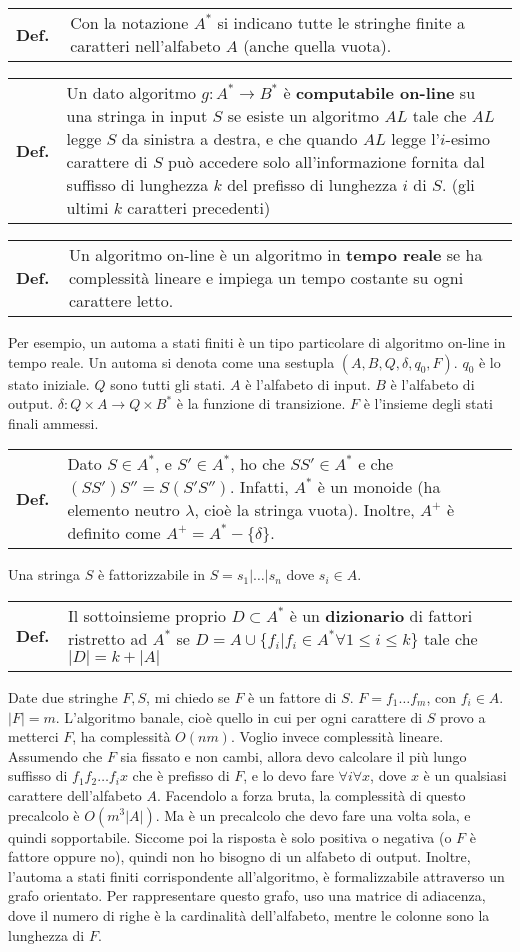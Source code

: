 \documentclass[a4paper,10pt]{article} %
\renewcommand{\b}[1]{%
    {\textbf{#1}}}
\newcommand{\mdef}[1]{%
    {\smallbreak\par\begin{tabular}{ll} \textbf{Def.$\;\;$} & \begin{minipage}[t]{0.80\columnwidth}\normalsize  {#1}\end{minipage}\tabularnewline \end{tabular}}\smallskip\par}
\begin{document}
\mdef{Con la notazione $A^*$ si indicano tutte le stringhe finite a caratteri nell'alfabeto $A$ (anche quella vuota).}

\mdef{Un dato algoritmo $g: A^* \rightarrow B^*$ è \b{computabile on-line} su una stringa in input $S$ se esiste un algoritmo $AL$ tale che $AL$ legge $S$ da sinistra a destra, e che quando $AL$ legge l'$i$-esimo carattere di $S$ può accedere solo all'informazione fornita dal suffisso di lunghezza $k$ del prefisso di lunghezza $i$ di $S$. (gli ultimi $k$ caratteri precedenti)}

\mdef{Un algoritmo on-line è un algoritmo in \b{tempo reale} se ha complessità lineare e impiega un tempo costante su ogni carattere letto.}

Per esempio, un automa a stati finiti è un tipo particolare di algoritmo on-line in tempo reale. Un automa si denota come una sestupla $(A, B, Q, \delta, q_0, F)$. $q_0$ è lo stato iniziale. $Q$ sono tutti gli stati. $A$ è l'alfabeto di input. $B$ è l'alfabeto di output. $\delta: Q \times A \rightarrow Q \times B^*$ è la funzione di transizione. $F$ è l'insieme degli stati finali ammessi.

\bigskip

\mdef{Dato $S \in A^*$, e $S' \in A^*$, ho che $S S' \in A^*$ e che $(S S')S'' = S(S'S'')$. Infatti, $A^*$ è un monoide (ha elemento neutro $\lambda$, cioè la stringa vuota). Inoltre, $A^+$ è definito come $A^+ = A^* - \{\delta\}$.}

Una stringa $S$ è fattorizzabile in $S = s_1 | \ldots | s_n$ dove $s_i \in A$. 

\mdef{Il sottoinsieme proprio $D \subset A^*$ è un \b{dizionario} di fattori ristretto ad $A^*$ se $D = A \cup \{ f_i | f_i \in A^* \forall 1 \leq i \leq k \}$ tale che $|D| = k + |A|$}


Date due stringhe $F, S$, mi chiedo se $F$ è un fattore di $S$. $F = f_1 \ldots f_m$, con $f_i \in A$. $|F| = m$. L'algoritmo banale, cioè quello in cui per ogni carattere di $S$ provo a metterci $F$, ha complessità $O(nm)$. Voglio invece complessità lineare. Assumendo che $F$ sia fissato e non cambi, allora devo calcolare il più lungo suffisso di $f_1f_2 \ldots f_ix$ che è prefisso di $F$, e lo devo fare $\forall i \forall x$, dove $x$ è un qualsiasi carattere dell'alfabeto $A$. Facendolo a forza bruta, la complessità di questo precalcolo è $O(m^3 |A|)$. Ma è un precalcolo che devo fare una volta sola, e quindi sopportabile. 
Siccome poi la risposta è solo positiva o negativa (o $F$ è fattore oppure no), quindi non ho bisogno di un alfabeto di output.
Inoltre, l'automa a stati finiti corrispondente all'algoritmo, è formalizzabile attraverso un grafo orientato. Per rappresentare questo grafo, uso una matrice di adiacenza, dove il numero di righe è la cardinalità dell'alfabeto, mentre le colonne sono la lunghezza di $F$.
\end{document}
